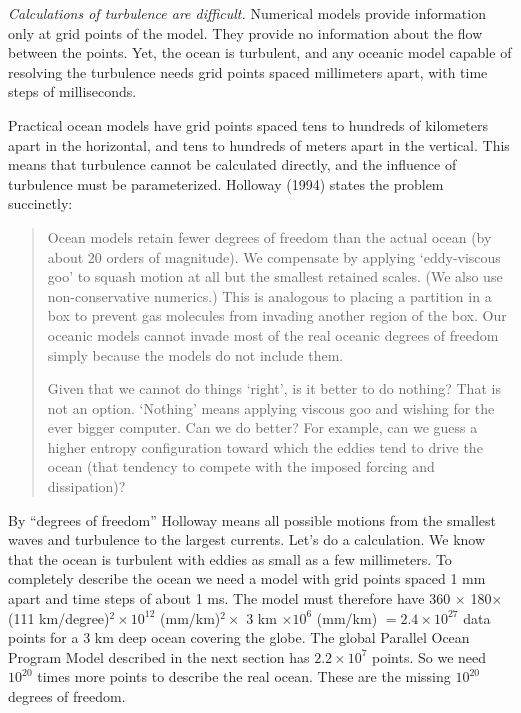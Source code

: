 \textit{Calculations of turbulence
  are difficult.} Numerical models provide information only at grid
points of the model. They provide no information about the flow
between the points. Yet, the ocean is turbulent, and any oceanic model
capable of resolving the turbulence needs grid points spaced
millimeters apart, with time steps of milliseconds.

Practical ocean models have grid points spaced tens to hundreds of
kilometers apart in the horizontal, and tens to hundreds of meters
apart in the vertical.  This means that
turbulence cannot be calculated
directly, and the influence of turbulence must be
parameterized. Holloway (1994) states the problem succinctly:

\begin{quotation} \small
Ocean models retain fewer degrees of freedom than the actual ocean (by
about 20 orders of magnitude). We compensate by applying `eddy-viscous
goo' to squash motion at all but the smallest retained scales. (We
also use non-conservative numerics.) This is analogous to placing a
partition in a box to prevent gas molecules from invading another
region of the box. Our oceanic models cannot invade most of the real
oceanic degrees of freedom simply because the models do not include
them.

Given that we cannot do things `right', is it better to do nothing?
That is not an option. `Nothing' means applying viscous goo and
wishing for the ever bigger computer. Can we do better? For example,
can we guess a higher entropy configuration toward which the eddies
tend to drive the ocean (that tendency to compete with the imposed
forcing and dissipation)?
\end{quotation}

By ``degrees of freedom'' Holloway means all possible motions from the
smallest waves and turbulence to the largest
currents. Let's do a calculation.  We know that the ocean is turbulent
with eddies as small as a few millimeters. To completely describe the
ocean we need a model with grid points spaced 1 mm apart and time
steps of about 1 ms. The model must therefore have 360\degrees
$\times$ 180\degrees $\times$ (111 km/degree)$^2 \times 10^{12}$
(mm/km)$^2 \times$ 3 km $\times 10^6$ (mm/km) $= 2.4 \times 10^{27}$
data points for a 3 km deep ocean covering the globe. The global
Parallel Ocean Program Model described in the next section has $2.2
\times 10^7$ points. So we need $10^{20}$ times more points to
describe the real ocean. These are the missing $10^{20}$ degrees of
freedom.

